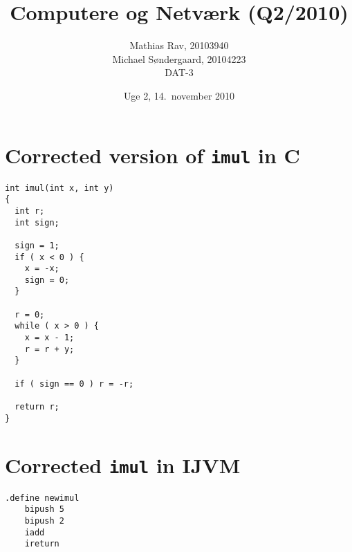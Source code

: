 \documentclass[12pt,a4paper]{article}
\title{Computere og Netværk (Q2/2010)}
\author{Mathias Rav, 20103940 \\
		Michael Søndergaard, 20104223 \\
		DAT-3}
\date{Uge 2, 14.\ november 2010}
\newcommand{\imul}{\texttt{imul}}
\begin{document}
\maketitle

\section{Corrected version of \imul{} in C}

\begin{lstlisting}
int imul(int x, int y)
{ 
  int r; 
  int sign;
    
  sign = 1;
  if ( x < 0 ) {
    x = -x;
    sign = 0;
  }

  r = 0;
  while ( x > 0 ) {
    x = x - 1;
    r = r + y;
  }

  if ( sign == 0 ) r = -r;

  return r;
}
\end{lstlisting}

\section{Corrected \imul{} in IJVM}

\lstset{language=JVMIS}
\begin{lstlisting}
.define newimul
	bipush 5
	bipush 2
	iadd
	ireturn

\end{lstlisting}
\end{document}
